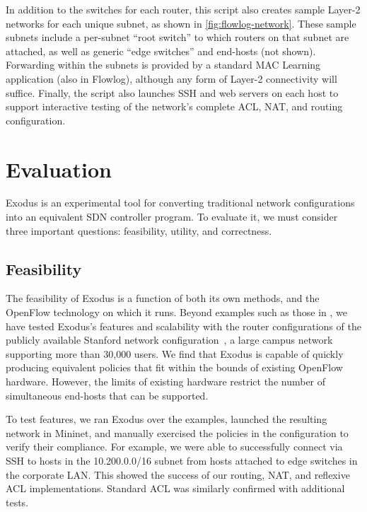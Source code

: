 In addition to the switches for each router, this script also creates sample
Layer-2 networks for each unique subnet, as shown in
\autoref{fig:flowlog-network}.  These sample subnets include a per-subnet
``root switch'' to which routers on that subnet are attached, as well as
generic ``edge switches'' and end-hosts (not shown).
Forwarding within the subnets is provided by a standard MAC Learning
application (also in Flowlog), although any form of Layer-2 connectivity will suffice.
Finally, the script also
launches SSH and web servers on each host to support interactive testing of the
network's complete ACL, NAT, and routing configuration.

\section{Evaluation}
\label{sec:evaluation}

Exodus is an experimental tool for converting traditional network configurations
into an equivalent SDN controller program. To evaluate it, we must consider three
important questions: feasibility, utility, and correctness.

\subsection{Feasibility}
\label{sec:feasibility}

The feasibility of Exodus is a function of both its own methods, and the OpenFlow
technology on which it runs. Beyond examples such as those in
, we have tested Exodus's 
features and scalability with the router configurations of
the publicly available Stanford network configuration~\cite{zeng12test},
a large campus network supporting more than 30,000 users. We find that Exodus
is capable of quickly producing equivalent policies that fit within the bounds of
existing OpenFlow hardware. However, the limits of existing
hardware restrict the number of simultaneous end-hosts that can be supported.

To test features, we ran Exodus over the  examples,
launched the resulting network in Mininet, and manually exercised the
policies in the configuration to verify their compliance. For example, 
we were able to successfully connect
via SSH to hosts in the 10.200.0.0/16 subnet from hosts attached to edge switches in
the corporate LAN. This showed the success of our routing, NAT, and reflexive ACL
implementations. Standard ACL was similarly confirmed with additional tests.

